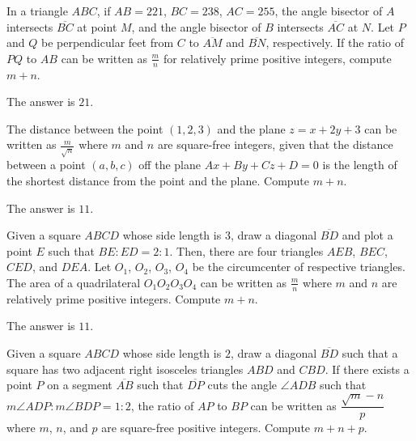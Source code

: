 \begin{problem}
In a triangle $ABC$, if $AB=221$, $BC=238$, $AC=255$, the angle bisector of $A$ intersects $\overline{BC}$ at point $M$, and the angle bisector of $B$ intersects $\overline{AC}$ at $N$. Let $P$ and $Q$ be perpendicular feet from $C$ to $\overline{AM}$ and $\overline{BN}$, respectively. If the ratio of $PQ$ to $AB$ can be written as $\frac{m}{n}$ for relatively prime positive integers, compute $m+n$.
\end{problem}

\begin{solution}
The answer is $21$.
\end{solution}

\begin{problem}
The distance between the point $(1,2,3)$ and the plane $z=x+2y+3$ can be written as $\frac{m}{\sqrt{n}}$ where $m$ and $n$ are square-free integers, given that the distance between a point $(a,b,c)$ off the plane $Ax+By+Cz+D=0$ is the length of the shortest distance from the point and the plane. Compute $m+n$.
\end{problem}

\begin{solution}
The answer is $11$.
\end{solution}

\begin{problem}
Given a square $ABCD$ whose side length is $3$, draw a diagonal $\overline{BD}$ and plot a point $E$ such that $BE:ED=2:1$. Then, there are four triangles $AEB$, $BEC$, $CED$, and $DEA$. Let $O_1$, $O_2$, $O_3$, $O_4$ be the circumcenter of respective triangles. The area of a quadrilateral $O_1O_2O_3O_4$ can be written as $\frac{m}{n}$ where $m$ and $n$ are relatively prime positive integers. Compute $m+n$.
\end{problem}

\begin{solution}
The answer is $11$.
\end{solution}

\begin{problem}
Given a square $ABCD$ whose side length is $2$, draw a diagonal $\overline{BD}$ such that a square has two adjacent right isosceles triangles $ABD$ and $CBD$. If there exists a point $P$ on a segment $\overline{AB}$ such that $\overline{DP}$ cuts the angle $\angle ADB$ such that $m\angle ADP : m \angle BDP = 1:2$, the ratio of $AP$ to $BP$ can be written as $\dfrac{\sqrt{m}-n}{p}$ where $m$, $n$, and $p$ are square-free positive integers. Compute $m+n+p$.
\end{problem}

